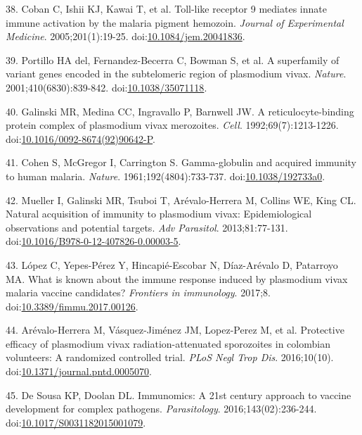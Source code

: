 \documentclass[a4paper]{article}
\begin{document}
\hypertarget{ref-coban2005toll}{}
38. Coban C, Ishii KJ, Kawai T, et al. Toll-like receptor 9 mediates
innate immune activation by the malaria pigment hemozoin. \emph{Journal
of Experimental Medicine}. 2005;201(1):19-25.
doi:\href{https://doi.org/10.1084/jem.20041836}{10.1084/jem.20041836}.

\hypertarget{ref-portillo2001vir}{}
39. Portillo HA del, Fernandez-Becerra C, Bowman S, et al. A superfamily
of variant genes encoded in the subtelomeric region of plasmodium vivax.
\emph{Nature}. 2001;410(6830):839-842.
doi:\href{https://doi.org/10.1038/35071118}{10.1038/35071118}.

\hypertarget{ref-galinski1992rbp}{}
40. Galinski MR, Medina CC, Ingravallo P, Barnwell JW. A
reticulocyte-binding protein complex of plasmodium vivax merozoites.
\emph{Cell}. 1992;69(7):1213-1226.
doi:\href{https://doi.org/10.1016/0092-8674(92)90642-P}{10.1016/0092-8674(92)90642-P}.

\hypertarget{ref-cohen1961}{}
41. Cohen S, McGregor I, Carrington S. Gamma-globulin and acquired
immunity to human malaria. \emph{Nature}. 1961;192(4804):733-737.
doi:\href{https://doi.org/10.1038/192733a0}{10.1038/192733a0}.

\hypertarget{ref-mueller2013}{}
42. Mueller I, Galinski MR, Tsuboi T, Arévalo-Herrera M, Collins WE,
King CL. Natural acquisition of immunity to plasmodium vivax:
Epidemiological observations and potential targets. \emph{Adv
Parasitol}. 2013;81:77-131.
doi:\href{https://doi.org/10.1016/B978-0-12-407826-0.00003-5}{10.1016/B978-0-12-407826-0.00003-5}.

\hypertarget{ref-lopez2017}{}
43. López C, Yepes-Pérez Y, Hincapié-Escobar N, Díaz-Arévalo D,
Patarroyo MA. What is known about the immune response induced by
plasmodium vivax malaria vaccine candidates? \emph{Frontiers in
immunology}. 2017;8.
doi:\href{https://doi.org/10.3389/fimmu.2017.00126}{10.3389/fimmu.2017.00126}.

\hypertarget{ref-arevalo2016spz}{}
44. Arévalo-Herrera M, Vásquez-Jiménez JM, Lopez-Perez M, et al.
Protective efficacy of plasmodium vivax radiation-attenuated sporozoites
in colombian volunteers: A randomized controlled trial. \emph{PLoS Negl
Trop Dis}. 2016;10(10).
doi:\href{https://doi.org/10.1371/journal.pntd.0005070}{10.1371/journal.pntd.0005070}.

\hypertarget{ref-immunomics2016}{}
45. De Sousa KP, Doolan DL. Immunomics: A 21st century approach to
vaccine development for complex pathogens. \emph{Parasitology}.
2016;143(02):236-244.
doi:\href{https://doi.org/10.1017/S0031182015001079}{10.1017/S0031182015001079}.
\end{document}
